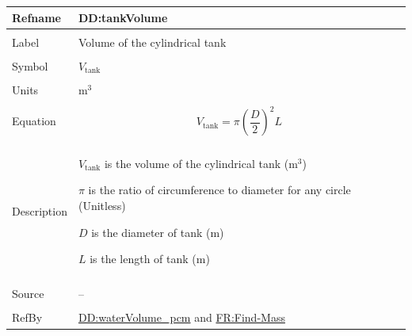 \documentclass[12pt]{article}
\begin{document}
\vspace{\baselineskip}
\noindent
\begin{minipage}{\textwidth}
\begin{tabular}{>{\raggedright}p{}>{\raggedright\arraybackslash}p{}}
\toprule \textbf{Refname} & \textbf{DD:tankVolume}
\label{DD:tankVolume}
\\ \midrule \\
Label & Volume of the cylindrical tank
        
\\ \midrule \\
Symbol & ${V_{\text{tank}}}$
         
\\ \midrule \\
Units & ${\text{m}^{3}}$
        
\\ \midrule \\
Equation & \begin{displaymath}
           {V_{\text{tank}}}=π \left(\frac{D}{2}\right)^{2} L
           \end{displaymath}
\\ \midrule \\
Description & \begin{symbDescription}
              \item{${V_{\text{tank}}}$ is the volume of the cylindrical tank (${\text{m}^{3}}$)}
              \item{$π$ is the ratio of circumference to diameter for any circle (Unitless)}
              \item{$D$ is the diameter of tank (${\text{m}}$)}
              \item{$L$ is the length of tank (${\text{m}}$)}
              \end{symbDescription}
\\ \midrule \\
Source & --
         
\\ \midrule \\
RefBy & \hyperref[DD:waterVolume.pcm]{DD:waterVolume\_pcm} and \hyperref[findMass]{FR:Find-Mass}
        
\\ \bottomrule
\end{tabular}
\end{minipage}
\end{document}
